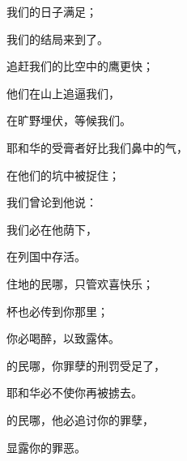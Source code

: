 {\par }{\Q 我们的日子满足；
\par }{\Q 我们的结局来到了。
\par }{\BB \par }{\Q {}追赶我们的比空中的鹰更快；
\par }{\Q 他们在山上追逼我们，
\par }{\Q 在旷野埋伏，等候我们。
\par }{\BB \par }{\Q {}耶和华的受膏者好比我们鼻中的气，
\par }{\Q 在他们的坑中被捉住；
\par }{\Q 我们曾论到他说：
\par }{\Q 我们必在他荫下，
\par }{\Q 在列国中存活。
\par }{\BB \par }{\Q {}住{}地的{}民哪，只管欢喜快乐；
\par }{杯也必传到你那里；
\par }{\Q 你必喝醉，以致露体。
\par }{\BB \par }{\Q {}的民哪，你罪孽的刑罚受足了，
\par }{\Q 耶和华必不使你再被掳去。
\par }{的民哪，他必追讨你的罪孽，
\par }{\Q 显露你的罪恶。

}
